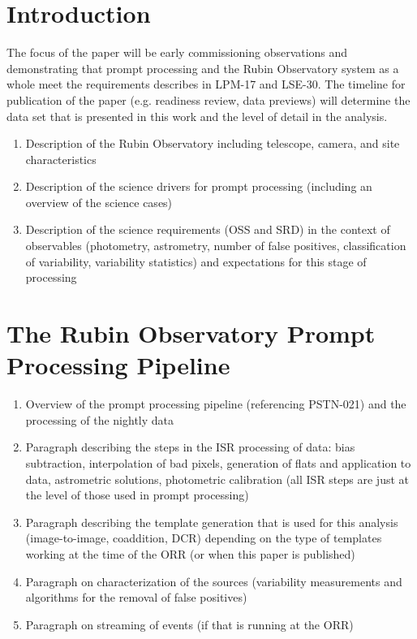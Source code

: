
\section{Introduction}

The focus of the paper will be early commissioning observations and demonstrating that prompt processing and the Rubin Observatory system as a whole
meet the requirements describes in LPM-17 and LSE-30. The timeline for publication of the 
paper (e.g. readiness review, data previews) will determine the data set that is presented in this work and the level of detail in the analysis.

\begin{enumerate}

\item Description of the Rubin Observatory including telescope, camera, and site characteristics 
\item Description of the science drivers for prompt processing (including an overview of the science cases) 
\item Description of the science requirements (OSS and SRD) in the context of observables (photometry, astrometry, number of false positives, 
classification of variability, variability statistics) and expectations for this stage of processing

\end{enumerate}

\section{The Rubin Observatory Prompt Processing Pipeline} 

\begin{enumerate}

    \item Overview of the prompt processing pipeline (referencing PSTN-021) and the processing of the nightly data
    \item Paragraph describing the steps in the ISR processing of data: bias subtraction, interpolation of bad pixels, generation of flats and application to data, 
    astrometric solutions, photometric calibration (all ISR steps are just at the level of those used in prompt processing)
    \item Paragraph describing the template generation that is used for this analysis (image-to-image, coaddition, DCR) depending on the 
    type of templates working at the time of the ORR (or when this paper is published)
    \item Paragraph on characterization of the sources (variability measurements and algorithms for the removal of false positives)
    \item Paragraph on streaming of events (if that is running at the ORR)
    
\end{enumerate}

